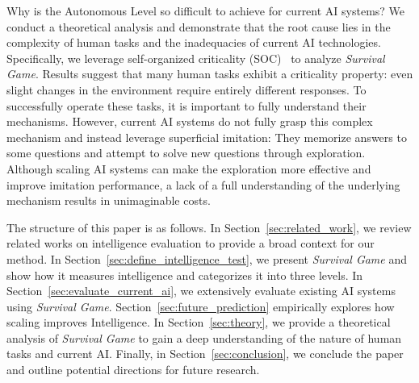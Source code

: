 Why is the Autonomous Level so difficult to achieve for current AI systems? We conduct a theoretical analysis and demonstrate that the root cause lies in the complexity of human tasks and the inadequacies of current AI technologies. Specifically, we leverage self-organized criticality (SOC)~\citep{bak2013nature} to analyze \textit{Survival Game}. Results suggest that many human tasks exhibit a criticality property: even slight changes in the environment require entirely different responses. To successfully operate these tasks, it is important to fully understand their mechanisms. However, current AI systems do not fully grasp this complex mechanism and instead leverage superficial imitation: They memorize answers to some questions and attempt to solve new questions through exploration. Although scaling AI systems can make the exploration more effective and improve imitation performance, a lack of a full understanding of the underlying mechanism results in unimaginable costs.

    
The structure of this paper is as follows. In Section~\ref{sec:related_work}, we review related works on intelligence evaluation to provide a broad context for our method. In Section~\ref{sec:define_intelligence_test}, we present \textit{Survival Game} and show how it measures intelligence and categorizes it into three levels. In Section~\ref{sec:evaluate_current_ai}, we extensively evaluate existing AI systems using \textit{Survival Game}. Section~\ref{sec:future_prediction} empirically explores how scaling improves Intelligence. In Section~\ref{sec:theory}, we provide a theoretical analysis of \textit{Survival Game} to gain a deep understanding of the nature of human tasks and current AI. Finally, in Section~\ref{sec:conclusion}, we conclude the paper and outline potential directions for future research.






